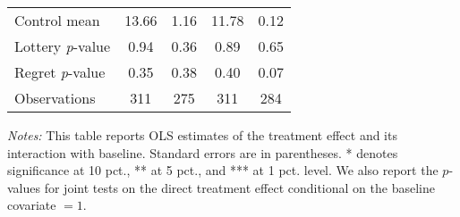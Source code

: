 \begin{table}[htbp]
{\begin{threeparttable}
\begin{tabular}{l*{4}{c}}
Control mean    &    13.66         &     1.16         &    11.78         &     0.12         \\
Lottery \emph{p}-value&     0.94         &     0.36         &     0.89         &     0.65         \\
Regret \emph{p}-value&     0.35         &     0.38         &     0.40         &     0.07         \\
Observations    &      311         &      275         &      311         &      284         \\
\bottomrule \end{tabular} \begin{tablenotes}[flushleft] \footnotesize \item \emph{Notes:} This table reports OLS estimates of the treatment effect and its interaction with baseline. Standard errors are in parentheses. * denotes significance at 10 pct., ** at 5 pct., and *** at 1 pct. level. We also report the \(p\)-values for joint tests on the direct treatment effect conditional on the baseline covariate $= 1$. \end{tablenotes} \end{threeparttable} } \end{table}

